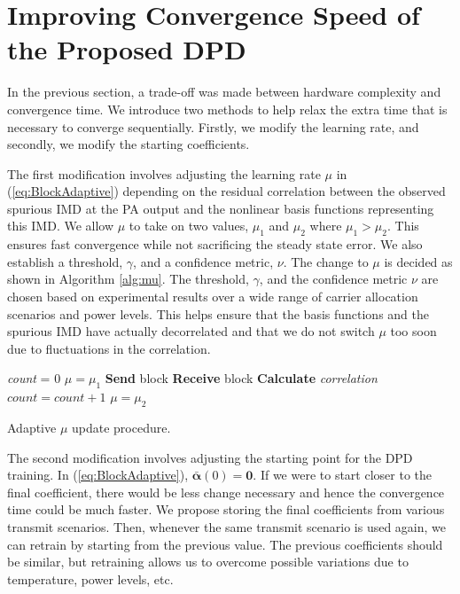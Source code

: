 \section{Improving Convergence Speed of the Proposed DPD}
\label{sec:ConvergenceSpeed}
In the previous section, a trade-off was made between hardware complexity and convergence time. We introduce two methods to help relax the extra time that is necessary to converge sequentially. 
Firstly, we modify the learning rate, and secondly, we modify the starting coefficients.

The first modification involves adjusting the learning rate $\mu$ in (\ref{eq:BlockAdaptive}) depending on the residual correlation between the observed spurious IMD at the PA output and the nonlinear basis functions representing this IMD.
We allow $\mu$ to take on two values, $\mu_1$ and $\mu_2$ where $\mu_1 > \mu_2$. 
This ensures fast convergence while not sacrificing the steady state error. 
We also establish a threshold, $\gamma$, and a confidence metric, $\nu$. 
The change to $\mu$ is decided as shown in Algorithm \ref{alg:mu}.
The threshold, $\gamma$, and the confidence metric $\nu$ are chosen based on experimental results over a wide range of carrier allocation scenarios and power levels. 
This helps ensure that the basis functions and the spurious IMD have actually decorrelated and that we do not switch $\mu$ too soon due to fluctuations in the correlation.
\begin{algorithm}[h]
	\SetAlgoLined
	\textit{count} = 0\;
	$\mu = \mu_1$\;
	{
		\textbf{Send} block\;
		\textbf{Receive} block\;
		\textbf{Calculate} \textit{correlation}\;
		{
			$count = count + 1$\; 
		}
		{
			$\mu = \mu_2$\; 
		}
	}
	\caption{Adaptive $\mu$ update procedure.}
	\label{alg:mu}
\end{algorithm}


The second modification involves adjusting the starting point for the DPD training. 
In (\ref{eq:BlockAdaptive}), $\bar{\boldsymbol{\alpha}}(0) = \mathbf{0}$. 
If we were to start closer to the final coefficient, there would be less change necessary and hence the convergence time could be much faster. 
We propose storing the final coefficients from various transmit scenarios. 
Then, whenever the same transmit scenario is used again, we can retrain by starting from the previous value. The previous coefficients should be similar, but retraining allows us to overcome possible variations due to temperature, power levels, etc. 


